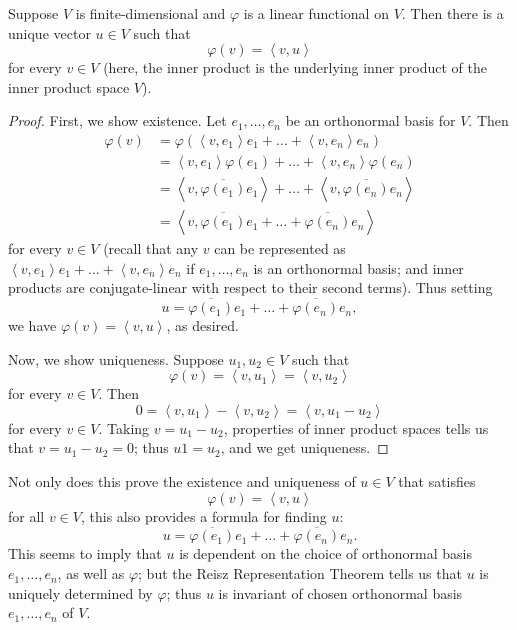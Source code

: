 \documentclass[math0540-lecture-notes.tex]{subfiles}
\begin{document}
\begin{theorem}{}
  Suppose $V$ is finite-dimensional and $\varphi$ is a linear functional on $V$. Then there is a
  unique vector $u\in V$ such that \[
    \varphi(v)=\left<v,u \right>
  \] for every $v\in V$ (here, the inner product is the underlying inner product of the inner
  product space $V$).
\end{theorem}
\begin{proof}[Proof]
  First, we show existence. Let $e_1,\ldots,e_n$ be an orthonormal basis for $V$. Then
  \begin{align*}
    \varphi(v)&= \varphi(\left<v,e_1 \right>e_1+\ldots+\left<v,e_n \right>e_n) \\
              &= \left<v,e_1 \right>\varphi(e_1)+\ldots+\left<v,e_n \right>\varphi(e_n) \\
              &= \left<v,\overline{\varphi(e_1)}e_1 \right>+\ldots+\left<v,\overline{\varphi(e_n)}
              e_n\right> \\
              &= \left<v,\overline{\varphi(e_1)}e_1+\ldots+\overline{\varphi(e_n)}e_n \right>
  \end{align*}
  for every $v\in V$ (recall that any $v$ can be represented as $\left<v,e_1
  \right>e_1+\ldots+\left<v,e_n \right>e_n$ if $e_1,\ldots,e_n$ is an orthonormal basis; and inner
  products are conjugate-linear with respect to their second terms). Thus setting \[
    u = \overline{\varphi(e_1)}e_1+\ldots+\overline{\varphi(e_n)}e_n
  ,\] we have $\varphi(v)=\left<v,u \right>$, as desired.

  Now, we show uniqueness. Suppose $u_1,u_2\in V$ such that \[
    \varphi(v)=\left<v,u_1 \right>=\left<v,u_2 \right>
  \] for every $v\in V$. Then \[
    0=\left<v,u_1 \right>-\left<v,u_2 \right> = \left<v,u_1-u_2 \right>
  \] for every $v\in V$. Taking $v=u_1-u_2$, properties of inner product spaces tells us that
  $v=u_1-u_2=0$; thus $u1=u_2$, and we get uniqueness.
\end{proof}

Not only does this prove the existence and uniqueness of $u\in V$ that satisfies \[
  \varphi(v)=\left<v,u \right>
\] for all $v\in V$, this also provides a formula for finding $u$: \[
    u = \overline{\varphi(e_1)}e_1+\ldots+\overline{\varphi(e_n)}e_n
.\] This seems to imply that $u$ is dependent on the choice of orthonormal basis $e_1,\ldots,e_n$,
as well as $\varphi$; but the Reisz Representation Theorem tells us that $u$ is uniquely determined
by $\varphi$; thus $u$ is invariant of chosen orthonormal basis $e_1,\ldots,e_n$ of $V$.
\end{document}
